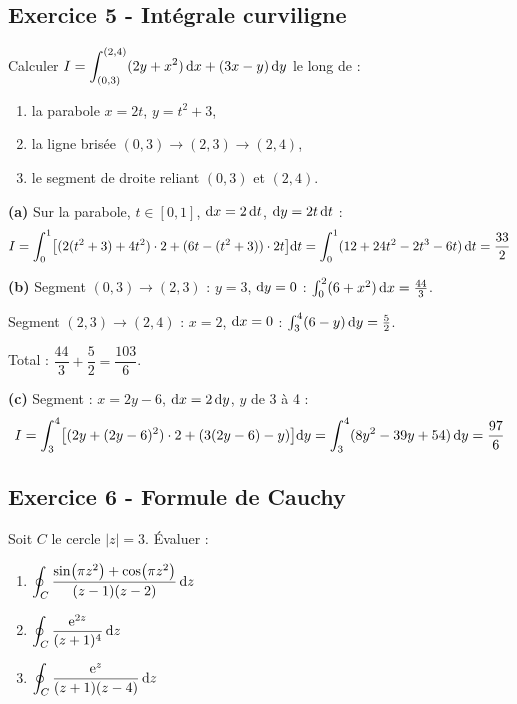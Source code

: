 \documentclass[12pt,a4paper]{article}
\begin{document}
\subsection*{Exercice 5 - Intégrale curviligne \niveau{\moyen}}

\begin{boiteexercice}
Calculer $\displaystyle I = \int_{(0,3)}^{(2,4)}(2y+x^2)\,\mathrm{d} x + (3x-y)\,\mathrm{d} y$ le long de :
\begin{enumerate}[label=(\alph*)]
  \item la parabole $x=2t$, $y=t^2+3$,
  \item la ligne brisée $(0,3)\to(2,3)\to(2,4)$,
  \item le segment de droite reliant $(0,3)$ et $(2,4)$.
\end{enumerate}
\end{boiteexercice}

\begin{boitecorrige}
\textbf{(a)} Sur la parabole, $t\in[0,1]$, $\mathrm{d} x=2\,\mathrm{d} t$, $\mathrm{d} y=2t\,\mathrm{d} t$ :
\[
I = \int_0^1\bigl[(2(t^2+3)+4t^2)\cdot2 + (6t-(t^2+3))\cdot2t\bigr]\mathrm{d} t = \int_0^1(12+24t^2-2t^3-6t)\,\mathrm{d} t = \frac{33}{2}
\]

\textbf{(b)} Segment $(0,3)\to(2,3)$ : $y=3$, $\mathrm{d} y=0$ :
$\int_0^2(6+x^2)\,\mathrm{d} x = \frac{44}{3}$.

Segment $(2,3)\to(2,4)$ : $x=2$, $\mathrm{d} x=0$ :
$\int_3^4(6-y)\,\mathrm{d} y = \frac{5}{2}$.

Total : $\dfrac{44}{3}+\dfrac{5}{2} = \dfrac{103}{6}$.

\textbf{(c)} Segment : $x=2y-6$, $\mathrm{d} x=2\,\mathrm{d} y$, $y$ de 3 à 4 :
\[
I = \int_3^4\bigl[(2y+(2y-6)^2)\cdot2 + (3(2y-6)-y)\bigr]\mathrm{d} y = \int_3^4(8y^2-39y+54)\,\mathrm{d} y = \frac{97}{6}
\]
\end{boitecorrige}

\subsection*{Exercice 6 - Formule de Cauchy \niveau{\moyen}}

\begin{boiteexercice}
Soit $C$ le cercle $|z|=3$. Évaluer :
\begin{enumerate}[label=(\alph*)]
  \item $\displaystyle\oint_C \frac{\sin(\pi z^2)+\cos(\pi z^2)}{(z-1)(z-2)}\,\mathrm{d} z$
  \item $\displaystyle\oint_C \frac{\mathrm{e}^{2z}}{(z+1)^4}\,\mathrm{d} z$
  \item $\displaystyle\oint_C \frac{\mathrm{e}^z}{(z+1)(z-4)}\,\mathrm{d} z$
\end{enumerate}
\end{boiteexercice}
\end{document}
